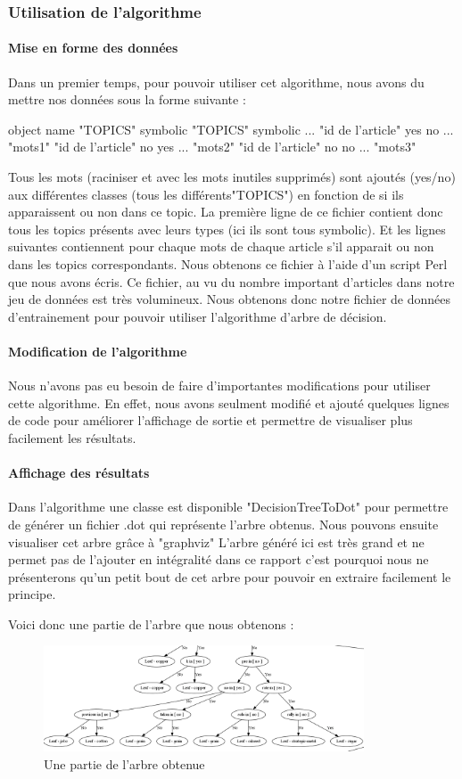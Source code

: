 \subsubsection{Utilisation de l'algorithme}

\paragraph{Mise en forme des données}  
Dans un premier temps, pour pouvoir utiliser cet algorithme, nous avons du mettre nos données sous la forme suivante :

object name "TOPICS" symbolic "TOPICS" symbolic ...
"id de l'article" yes no ... "mots1"
"id de l'article" no yes ... "mots2"
"id de l'article" no no ... "mots3"

Tous les mots (raciniser et avec les mots inutiles supprimés) sont ajoutés (yes/no) aux différentes classes (tous les différents"TOPICS") en fonction de si ils apparaissent ou non dans ce topic.
La première ligne de ce fichier contient donc tous les topics présents avec leurs types (ici ils sont tous symbolic). Et les lignes suivantes contiennent pour chaque mots de chaque article s'il apparait ou non dans les topics correspondants.
Nous obtenons ce fichier à l'aide d'un script Perl que nous avons écris. Ce fichier, au vu du nombre important d'articles dans notre jeu de données est très volumineux. Nous obtenons donc notre fichier de données d'entrainement pour pouvoir utiliser l'algorithme d'arbre de décision.

\paragraph{Modification de l'algorithme}  
Nous n'avons pas eu besoin de faire d'importantes modifications pour utiliser cette algorithme. En effet, nous avons seulment modifié et ajouté quelques lignes de code pour améliorer l'affichage de sortie et permettre de visualiser plus facilement les résultats.

\paragraph{Affichage des résultats}
Dans l'algorithme une classe est disponible "DecisionTreeToDot" pour permettre de générer un fichier .dot qui représente l'arbre obtenus. Nous pouvons ensuite visualiser cet arbre grâce à "graphviz"
L'arbre généré ici est très grand et ne permet pas de l'ajouter en intégralité dans ce rapport c'est pourquoi nous ne présenterons qu'un petit bout de cet arbre pour pouvoir en extraire facilement le principe. 

Voici donc une partie de l'arbre que nous obtenons :

\begin{figure}[h]									%
\centering										%
\includegraphics[width=95mm]{./arbre.png}	%
\caption{Une partie de l'arbre obtenue}		%
\label{deviceWindow}								%
\end{figure}

